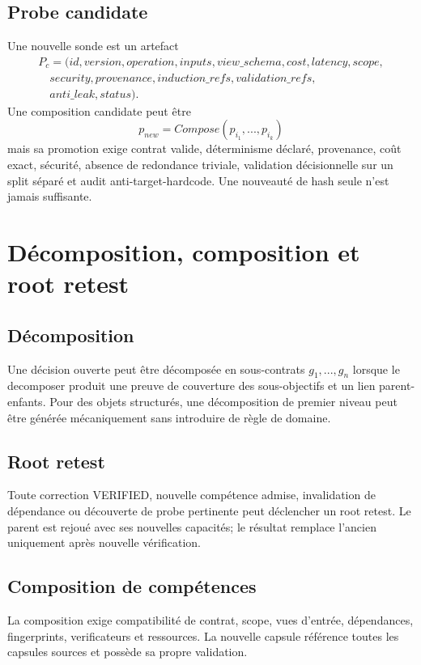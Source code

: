 \documentclass[11pt,a4paper]{report}
\begin{document}
\section{Probe candidate}
Une nouvelle sonde est un artefact
\[
\begin{aligned}
P_c=(id,version,operation,inputs,view\_schema,cost,latency,scope,\\
\quad security,provenance,induction\_refs,validation\_refs,\\
\quad anti\_leak,status).
\end{aligned}
\]
Une composition candidate peut être
\[
p_{new}=Compose(p_{i_1},...,p_{i_k})
\]
mais sa promotion exige contrat valide, déterminisme déclaré, provenance, coût exact, sécurité, absence de redondance triviale, validation décisionnelle sur un split séparé et audit anti-target-hardcode. Une nouveauté de hash seule n'est jamais suffisante.

\chapter{Décomposition, composition et root retest}
\section{Décomposition}
Une décision ouverte peut être décomposée en sous-contrats $g_1,...,g_n$ lorsque le decomposer produit une preuve de couverture des sous-objectifs et un lien parent-enfants. Pour des objets structurés, une décomposition de premier niveau peut être générée mécaniquement sans introduire de règle de domaine.

\section{Root retest}
Toute correction VERIFIED, nouvelle compétence admise, invalidation de dépendance ou découverte de probe pertinente peut déclencher un root retest. Le parent est rejoué avec ses nouvelles capacités; le résultat remplace l'ancien uniquement après nouvelle vérification.

\section{Composition de compétences}
La composition exige compatibilité de contrat, scope, vues d'entrée, dépendances, fingerprints, verificateurs et ressources. La nouvelle capsule référence toutes les capsules sources et possède sa propre validation.
\end{document}
